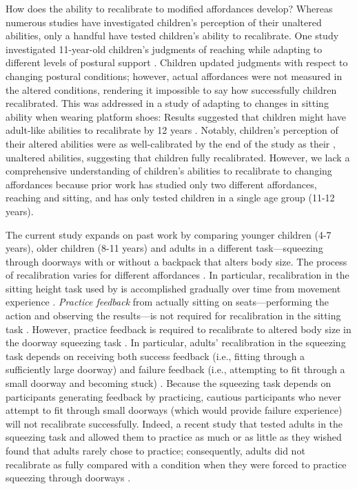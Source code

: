 \documentclass[a4paper,man,natbib,floatsintext,noextraspace]{apa6}
\begin{document}
How does the ability to recalibrate to modified affordances develop? Whereas numerous studies have investigated children's perception of their unaltered abilities, only a handful have tested children's ability to recalibrate. One study investigated 11-year-old children’s judgments of reaching while adapting to different levels of postural support \citep{JohnsonWade2009}. Children updated judgments with respect to changing postural conditions; however, actual affordances were not measured in the altered conditions, rendering it impossible to say how successfully children recalibrated. This was addressed in a study of adapting to changes in sitting ability when wearing platform shoes: Results suggested that children might have adult-like abilities to recalibrate by 12 years \citep{ChenRecal}. Notably, children's perception of their altered abilities were as well-calibrated by the end of the study as their , unaltered abilities, suggesting that children fully recalibrated. However, we lack a comprehensive understanding of children's abilities to recalibrate to changing affordances because prior work has studied only two different affordances, reaching and sitting, and has only tested children in a single age group (11-12 years). 

The current study expands on past work by comparing younger children (4-7 years), older children (8-11 years) and adults in a different task---squeezing through doorways with or without a backpack that alters body size. The process of recalibration varies for different affordances \citep{Recal}. In particular, recalibration in the sitting height task used by \cite{ChenRecal} is accomplished gradually over time from movement experience \cite{Mark87}. \textit{Practice feedback} from actually sitting on seats---performing the action and observing the results---is not required for recalibration in the sitting task \citep{MarkSitting90}. However, practice feedback is required to recalibrate to altered body size in the doorway squeezing task \citep{Recal,PregAps}. In particular, adults' recalibration in the squeezing task depends on receiving both success feedback (i.e., fitting through a sufficiently large doorway) and failure feedback (i.e., attempting to fit through a small doorway and becoming stuck) \citep{DoorwayLearning}. Because the squeezing task depends on participants generating feedback by practicing, cautious participants who never attempt to fit through small doorways (which would provide failure experience) will not recalibrate successfully. Indeed, a recent study that tested adults in the squeezing task and allowed them to practice as much or as little as they wished found that adults rarely chose to practice; consequently, adults did not recalibrate as fully compared with a condition when they were forced to practice squeezing through doorways \citep{DoorwayExplore}. 
\end{document}
